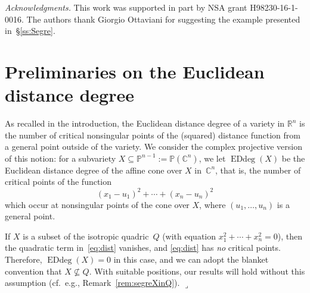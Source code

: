 \documentclass[11pt]{amsart}
\numberwithin{equation}{section}
\newcommand{\Cbb}{{\mathbb{C}}}
\newcommand{\Pbb}{{\mathbb{P}}}
\newcommand{\Rbb}{{\mathbb{R}}}
\DeclareMathOperator{\Edd}{EDdeg}
\newcommand{\qede}{\hfill$\lrcorner$}
\begin{document}
\smallskip

{\em Acknowledgments.} This work was supported in part by NSA grant 
H98230-16-1-0016.
The authors thank Giorgio Ottaviani for suggesting the example presented 
in~\S\ref{ss:Segre}.

\section{Preliminaries on the Euclidean distance degree}\label{s:EDD}

As recalled in the introduction, the Euclidean distance degree of a variety in
$\Rbb^n$ is the number of critical nonsingular points of the (squared) distance 
function from a general point outside of the variety. We consider the complex 
projective version of this notion: for a subvariety $X\subseteq \Pbb^{n-1} :=\Pbb(\Cbb^n)$, we 
let $\Edd(X)$ be the Euclidean distance degree of the affine cone over $X$ 
in~$\Cbb^n$, that is, the number of critical points of the function
\begin{equation}\label{eq:dist}
(x_1-u_1)^2 +\cdots + (x_n-u_n)^2
\end{equation}
which occur at nonsingular points of the cone over $X$, where $(u_1,\dots,u_n)$
is a general point.

\begin{remark}\label{rem:XinQ}
If $X$ is a subset of the isotropic quadric~$Q$ (with equation $x_1^2+\cdots 
+ x_n^2=0$), then the quadratic term in~\eqref{eq:dist} vanishes, and
\eqref{eq:dist} has {\em no\/} critical points. Therefore, $\Edd(X)=0$ in this
case, and we can adopt the blanket convention that $X\not\subseteq Q$. 
With suitable positions, our results will hold without this assumption 
(cf.~e.g., Remark~\ref{rem:segreXinQ}). 
\qede\end{remark}
\end{document}
